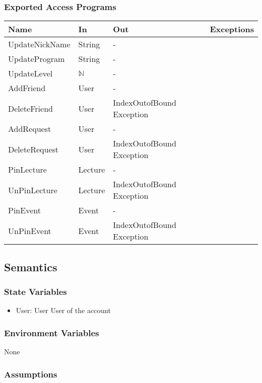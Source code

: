 \documentclass[12pt, titlepage]{article}
\begin{document}
\subsubsection{Exported Access Programs}
\begin{center}
\begin{tabular}{p{4cm} p{2cm} p{4cm} p{4cm}}
\hline
\textbf{Name} & \textbf{In} & \textbf{Out} & \textbf{Exceptions} \\
\hline
UpdateNickName & String & -\\
UpdateProgram & String & -\\
UpdateLevel & $\mathbb{N}$ & -\\
AddFriend & User & -\\
DeleteFriend & User & IndexOutofBound Exception\\
AddRequest & User & -\\
DeleteRequest & User & IndexOutofBound Exception\\
PinLecture & Lecture & - \\
UnPinLecture & Lecture & IndexOutofBound Exception\\
PinEvent & Event & - \\
UnPinEvent & Event & IndexOutofBound Exception\\
\hline
\end{tabular}
\end{center}

\subsection{Semantics}

\subsubsection{State Variables}

\begin{itemize}
\item User: User
User of the account
\end{itemize}

\subsubsection{Environment Variables}

None

\subsubsection{Assumptions}
\end{document}
